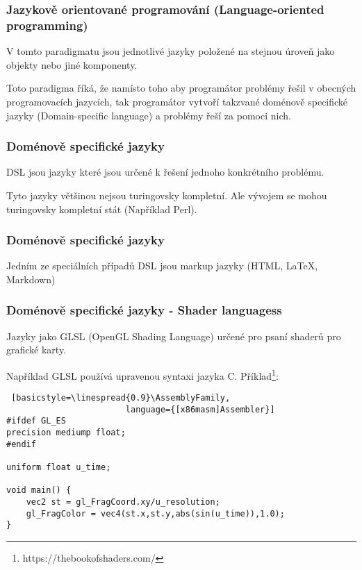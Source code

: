 \begin{frame}
    \frametitle{Jazykově orientované programování (Language-oriented programming)}

    V tomto paradigmatu jsou jednotlivé jazyky položené na stejnou úroveň jako objekty nebo jiné komponenty.

    Toto paradigma říká, že namísto toho aby programátor problémy řešil v obecných programovacích jazycích, tak programátor vytvoří takzvané doménově specifické jazyky (Domain-specific language) a problémy řeší za pomoci nich.

\end{frame}


\begin{frame}
    \frametitle{Doménově specifické jazyky}
    DSL jsou jazyky které jsou určené k řešení jednoho konkrétního problému.

    Tyto jazyky většinou nejsou turingovsky kompletní. Ale vývojem se mohou turingovsky kompletní stát (Například Perl).

    


\end{frame}

\begin{frame}
    \frametitle{Doménově specifické jazyky}

    Jedním ze speciálních případů DSL jsou markup jazyky (HTML, LaTeX, Markdown)



\end{frame}

\begin{frame}[fragile]
    \frametitle{Doménově specifické jazyky - Shader languagess}
    Jazyky jako GLSL (OpenGL Shading Language) určené pro psaní shaderů pro grafické karty.
    
    Například GLSL používá upravenou syntaxi jazyka C. Příklad\footnote{https://thebookofshaders.com/}:

    \newfontfamily{}
    \begin{lstlisting} [basicstyle=\linespread{0.9}\AssemblyFamily,
                        language={[x86masm]Assembler}]
#ifdef GL_ES
precision mediump float;
#endif

uniform float u_time;

void main() {
	vec2 st = gl_FragCoord.xy/u_resolution;
	gl_FragColor = vec4(st.x,st.y,abs(sin(u_time)),1.0);
}

    \end{lstlisting}




\end{frame}

